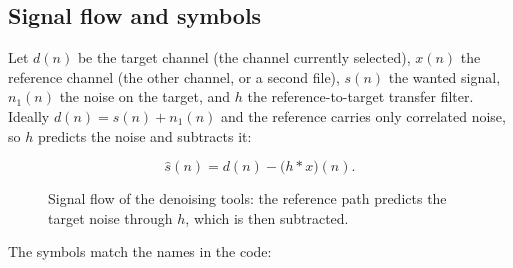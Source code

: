 \documentclass[UTF8,a4paper,12pt]{ctexart}
\begin{document}
\subsection{Signal flow and symbols}

Let $d(n)$ be the target channel (the channel currently selected), $x(n)$ the reference channel (the other channel, or a second file), $s(n)$ the wanted signal, $n_1(n)$ the noise on the target, and $h$ the reference-to-target transfer filter. Ideally $d(n)=s(n)+n_1(n)$ and the reference carries only correlated noise, so $h$ predicts the noise and subtracts it:

\[
\hat{s}(n)=d(n)-\big(h*x\big)(n).
\]

\begin{figure}[htbp]
\centering
{}
\caption{Signal flow of the denoising tools: the reference path predicts the target noise through $h$, which is then subtracted.}
\label{fig:anc-flow-en}
\end{figure}

The symbols match the names in the code:
\end{document}
